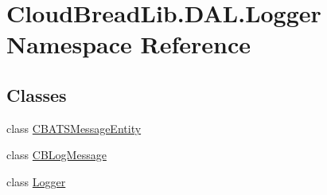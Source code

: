 \hypertarget{a00436}{}\section{Cloud\+Bread\+Lib.\+D\+A\+L.\+Logger Namespace Reference}
\label{a00436}
\subsection*{Classes}
\begin{DoxyCompactItemize}
\item 
class \hyperlink{a00026}{C\+B\+A\+T\+S\+Message\+Entity}
\item 
class \hyperlink{a00044}{C\+B\+Log\+Message}
\item 
class \hyperlink{a00129}{Logger}
\end{DoxyCompactItemize}
